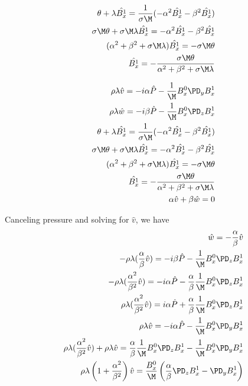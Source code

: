 \documentclass[11pt]{article}
\begin{document}
\begin{equation}\begin{aligned}
\theta + \lambda \hat{B_x^{1}} = \frac{1}{\sigma \M} (-\alpha^2 \hat{B_x^{1}}-\beta^2 \hat{B_x^{1}} ) \\
\sigma \M \theta + \sigma \M \lambda \hat{B_x^{1}} = -\alpha^2 \hat{B_x^{1}}-\beta^2 \hat{B_x^{1}} \\
(\alpha^2 +\beta^2 + \sigma \M \lambda ) \hat{B_x^{1}} = -\sigma \M \theta \\
\hat{B_x^{1}} = - \frac{\sigma \M \theta}{\alpha^2 +\beta^2 + \sigma \M \lambda} \\
\end{aligned} \end{equation}

\begin{equation}\begin{aligned}
\rho \lambda \hat{v} = -i \alpha \hat{P} - \frac{1}{\M} B_x^0 \PD_y B_x^{1} \\
\rho \lambda \hat{w} = -i \beta  \hat{P} - \frac{1}{\M} B_x^0 \PD_z B_x^{1} \\
\theta + \lambda \hat{B_x^{1}} = \frac{1}{\sigma \M} (-\alpha^2 \hat{B_x^{1}}-\beta^2 \hat{B_x^{1}} ) \\
\sigma \M \theta + \sigma \M \lambda \hat{B_x^{1}} = -\alpha^2 \hat{B_x^{1}}-\beta^2 \hat{B_x^{1}} \\
(\alpha^2 +\beta^2 + \sigma \M \lambda ) \hat{B_x^{1}} = -\sigma \M \theta \\
\hat{B_x^{1}} = - \frac{\sigma \M \theta}{\alpha^2 +\beta^2 + \sigma \M \lambda} \\
\alpha \hat{v} + \beta \hat{w} = 0  \\
\end{aligned} \end{equation}

Canceling pressure and solving for $\hat{v}$, we have
\begin{equation}\begin{aligned}
\hat{w} = - \frac{\alpha}{\beta} \hat{v} \\
-\rho \lambda (\frac{\alpha}{\beta} \hat{v}) = -i\beta \hat{P} - \frac{1}{\M} B_x^0 \PD_z B_x^{1} \\
-\rho \lambda (\frac{\alpha^2}{\beta^2} \hat{v}) = -i\alpha \hat{P} - \frac{\alpha}{\beta} \frac{1}{\M} B_x^0 \PD_z B_x^{1} \\
\rho \lambda (\frac{\alpha^2}{\beta^2} \hat{v}) = i\alpha \hat{P} + \frac{\alpha}{\beta} \frac{1}{\M} B_x^0 \PD_z B_x^{1} \\
\rho \lambda \hat{v} = -i\alpha \hat{P} - \frac{1}{\M} B_x^0 \PD_y B_x^{1} \\
\rho \lambda (\frac{\alpha^2}{\beta^2} \hat{v}) + \rho \lambda \hat{v} = \frac{\alpha}{\beta} \frac{1}{\M} B_x^0 \PD_z B_x^{1} - \frac{1}{\M} B_x^0 \PD_y B_x^{1} \\
\rho \lambda \left(1 + \frac{\alpha^2}{\beta^2} \right) \hat{v} = \frac{B_x^0}{\M} \left(\frac{\alpha}{\beta} \PD_z B_x^{1} - \PD_y B_x^{1} \right) \\
\end{aligned} \end{equation}
\end{document}
